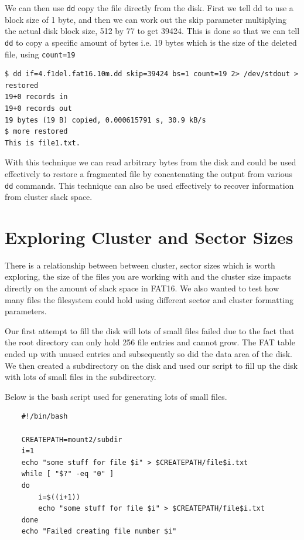 \documentclass[a4paper,
    11pt,
    normalheadings,
    parindent,
    UKenglish,
    abstracton,
    ]{scrartcl}
\begin{document}
We can then use \texttt{dd} copy the file directly from the disk. First we tell dd to use a block size of 1 byte, and then we can work out the skip parameter multiplying the actual disk block size, 512 by 77 to get 39424. This is done so that we can tell \texttt{dd} to copy a specific amount of bytes i.e. 19 bytes which is the size of the deleted file, using \texttt{count=19}

\begin{verbatim}
$ dd if=4.f1del.fat16.10m.dd skip=39424 bs=1 count=19 2> /dev/stdout > restored
19+0 records in
19+0 records out
19 bytes (19 B) copied, 0.000615791 s, 30.9 kB/s
$ more restored
This is file1.txt.
\end{verbatim}

With this technique we can read arbitrary bytes from the disk and could be used effectively to restore a fragmented file by concatenating the output from various \texttt{dd} commands. This technique can also be used effectively to recover information from cluster slack space.

\section{Exploring Cluster and Sector Sizes}
There is a relationship between between cluster, sector sizes which is worth exploring, the size of the files you are working with and the cluster size impacts directly on the amount of slack space in FAT16. We also wanted to test how many files the filesystem could hold using different sector and cluster formatting parameters.

Our first attempt to fill the disk will lots of small files failed due to the fact that the root directory can only hold 256 file entries and cannot grow. The FAT table ended up with unused entries and subsequently so did the data area of the disk. We then created a subdirectory on the disk and used our script to fill up the disk with lots of small files in the subdirectory.

Below is the bash script used for generating lots of small files.
\begin{verbatim}
    #!/bin/bash

    CREATEPATH=mount2/subdir
    i=1
    echo "some stuff for file $i" > $CREATEPATH/file$i.txt
    while [ "$?" -eq "0" ]
    do
        i=$((i+1))
        echo "some stuff for file $i" > $CREATEPATH/file$i.txt
    done
    echo "Failed creating file number $i"
\end{verbatim}
\end{document}
